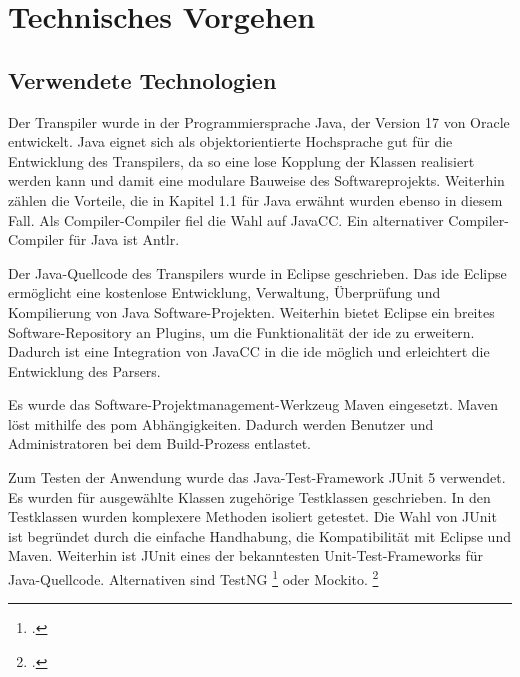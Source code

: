\section{Technisches Vorgehen}
\subsection{Verwendete Technologien}

Der Transpiler wurde in der Programmiersprache Java, der Version 17 von Oracle entwickelt. 
Java eignet sich als objektorientierte Hochsprache gut für die Entwicklung des Transpilers, da so eine lose Kopplung der Klassen realisiert werden kann und damit eine modulare Bauweise des Softwareprojekts. Weiterhin zählen die Vorteile, die in Kapitel 1.1 für Java erwähnt wurden ebenso in diesem Fall.  Als Compiler-Compiler fiel die Wahl auf JavaCC. Ein alternativer Compiler-Compiler für Java ist Antlr. 

Der Java-Quellcode des Transpilers wurde in Eclipse geschrieben. Das \ac{ide} Eclipse ermöglicht eine kostenlose Entwicklung, Verwaltung, Überprüfung und Kompilierung von Java Software-Projekten. Weiterhin bietet Eclipse ein breites Software-Repository an Plugins, um die Funktionalität der  \ac{ide} zu erweitern. Dadurch ist eine Integration von JavaCC in die  \ac{ide} möglich und erleichtert die Entwicklung des Parsers.

Es wurde das Software-Projektmanagement-Werkzeug Maven eingesetzt. Maven löst mithilfe des \ac{pom} Abhängigkeiten. Dadurch werden Benutzer und Administratoren bei dem Build-Prozess entlastet.

Zum Testen der Anwendung wurde das Java-Test-Framework JUnit 5 verwendet. Es wurden für ausgewählte Klassen zugehörige Testklassen geschrieben. In den Testklassen wurden komplexere Methoden isoliert getestet. Die Wahl von JUnit ist begründet durch die einfache Handhabung, die Kompatibilität mit Eclipse und Maven. Weiterhin ist JUnit eines der bekanntesten Unit-Test-Frameworks für Java-Quellcode. Alternativen sind  TestNG \footcite[Vgl. ][]{testng} oder Mockito. \footcite[Vgl. ][]{mockito}

